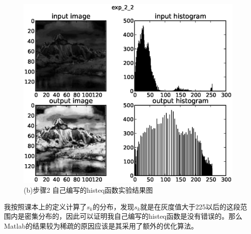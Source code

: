 \documentclass[]{IEEEphot}
\begin{document}
\begin{figure}[h]
	\centering
	\includegraphics[width=30pc]{exp_2_2.eps}
	\caption{(b)步骤2 自己编写的histeq函数实验结果图}
\end{figure}
我按照课本上的定义计算了$s_k$的分布，发现$s_k$就是在灰度值大于225以后的这段范围内是密集分布的，因此可以证明我自己编写的histeq函数是没有错误的。那么Matlab的结果较为稀疏的原因应该是其采用了额外的优化算法。
\end{document}
